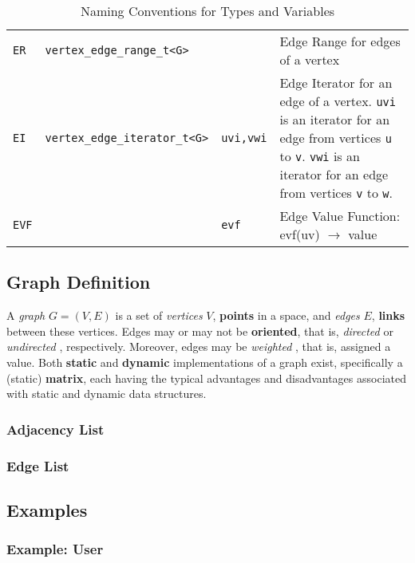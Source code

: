 \documentclass[10pt,onecolumn]{article}
\newcommand{\tcode}[1]{\lstinline[breaklines=true]{#1}}
\begin{document}
\begin{table}[h!]
\begin{center}
{\begin{tabular}{l l l p{7cm}}
    \tcode{ER} &  \tcode{vertex_edge_range_t<G>} & & Edge Range for edges of a vertex \\
    \tcode{EI} & \tcode{vertex_edge_iterator_t<G>} & \tcode{uvi,vwi} & Edge Iterator for an edge of a vertex. \tcode{uvi} is an iterator for an edge from vertices \tcode{u} to \tcode{v}. \tcode{vwi} is an iterator for an edge from vertices \tcode{v} to \tcode{w}. \\
    \tcode{EVF} & & \tcode{evf} & Edge Value Function: evf(uv) $\rightarrow$ value \\
\hline
\end{tabular}}
\caption{Naming Conventions for Types and Variables}
\label{tab:name_conv}
\end{center}
\end{table}

\subsection{Graph Definition}
 A \textit{graph} \cite{REF_graph} $G = (V, E)$ is a set of \textit{vertices} \cite{REF_graph} $V$, \textbf{points} in a space, and \textit{edges} \cite{REF_graph} $E$, \textbf{links} between these vertices. Edges may or may not be \textbf{oriented}, that is, \textit{directed} \cite{REF_graph} or \textit{undirected} \cite{REF_graph}, respectively. Moreover, edges may be \textit{weighted} \cite{REF_graph}, that is, assigned a value. Both \textbf{static} and \textbf{dynamic} implementations of a graph exist, specifically a (static) \textbf{matrix}, each having the typical advantages and disadvantages associated with static and dynamic data structures.

\subsubsection{Adjacency List}

\subsubsection{Edge List}

\subsection{Examples}
\subsubsection{Example: User}
\end{document}
